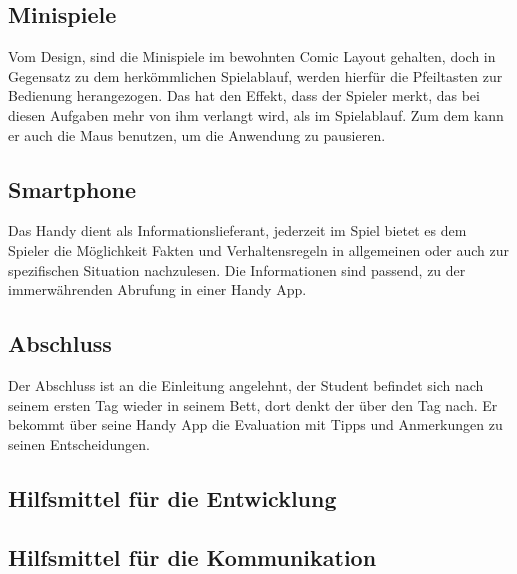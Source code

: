 \documentclass[a4paper, 11pt]{article} %
\begin{document}
\subsection{Minispiele}
Vom Design, sind die Minispiele im bewohnten Comic Layout gehalten, doch in Gegensatz zu dem herkömmlichen Spielablauf, werden hierfür die Pfeiltasten zur Bedienung herangezogen. Das hat den Effekt, dass der Spieler merkt, das bei diesen Aufgaben mehr von ihm verlangt wird, als im Spielablauf. Zum dem kann er auch die Maus benutzen, um die Anwendung zu pausieren.

\subsection{Smartphone}
Das Handy dient als Informationslieferant, jederzeit im Spiel bietet es dem Spieler die Möglichkeit Fakten und Verhaltensregeln in allgemeinen oder auch zur spezifischen Situation nachzulesen.
Die Informationen sind passend, zu der immerwährenden Abrufung in einer Handy App.

\subsection{Abschluss}
Der Abschluss ist an die Einleitung angelehnt, der Student befindet sich nach seinem ersten Tag wieder in seinem Bett, dort denkt der über den Tag nach. Er bekommt über seine Handy App die Evaluation mit Tipps und Anmerkungen zu seinen Entscheidungen. 

\subsection{Hilfsmittel für die Entwicklung}

\subsection{Hilfsmittel für die Kommunikation}
\end{document}
